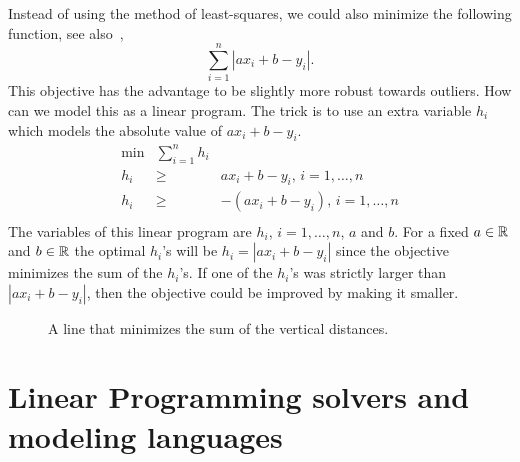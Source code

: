 Instead of using the method of least-squares, we could also minimize
the following function, see also~\cite[Chapter 2.4]{1214763},
\begin{equation}
  \label{eq:57}
  \sum_{i=1}^n |ax_i + b-y_i|.
\end{equation}
This objective has the advantage to be slightly more robust towards
outliers. How can we model this as a linear program. The
trick is to use an extra variable $h_i$ which models the absolute
value of $ax_i+b - y_i$. 
\begin{equation}
  \label{eq:58}
  \begin{array}{lcr}
    \min & \sum_{i=1}^n h_i \\
    h_i & \geq & a x_i + b-y_i,  \, i=1,\ldots,n \\
    h_i & \geq & -(a x_i + b-y_i ),  \, i=1,\ldots,n \\    
  \end{array}
\end{equation}
The variables of this linear program are  $h_i$, $i=1,\ldots,n$, $a$ and
$b$. For a fixed $a\in \mathbb{R}$ and $b \in \mathbb{R}$ the optimal $h_i$'s will be
$h_i  = |ax_i + b-y_i|$ since the objective minimizes the sum of the
$h_i$'s. If one of the $h_i$'s was strictly larger than  $|ax_i + b-y_i|$,
then the objective could be improved by making it smaller. 

\begin{figure}
  \centering


  \caption{A line that minimizes the sum of the vertical distances.}
  \label{fig:4}
\end{figure}


\section{Linear Programming solvers and modeling languages}
\label{sec:line-progr-solv}

